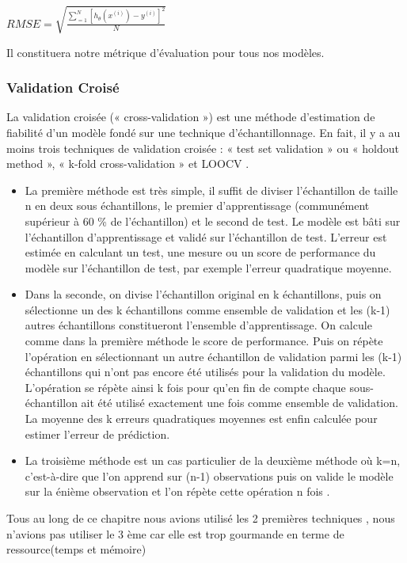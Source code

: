  $RMSE=\sqrt{\frac{\sum _{=1}^{N}{\left[{h}_{\theta}\left({x}^{(i)}\right) - {y}^{(i)}\right]}^2} {N}}$
 
 Il constituera notre métrique d'évaluation pour tous nos modèles.
\subsubsection{Validation Croisé  \cite{CrossValidation}}
La validation croisée (« cross-validation ») est une méthode d’estimation de fiabilité d’un modèle fondé sur une technique d’échantillonnage. En fait, il y a au moins trois techniques de validation croisée : « test set validation » ou « holdout method », « k-fold cross-validation » et \ac{LOOCV} .
\begin{itemize}
	\item La première méthode est très simple, il suffit de diviser l'échantillon de taille n en deux sous échantillons, le premier d'apprentissage (communément supérieur à 60 \% de l'échantillon) et le second de test. Le modèle est bâti sur l'échantillon d'apprentissage et validé sur l'échantillon de test. L'erreur est estimée en calculant un test, une mesure ou un score de performance du modèle sur l'échantillon de test, par exemple l'erreur quadratique moyenne.
	\item Dans la seconde, on divise l'échantillon original en k échantillons, puis on sélectionne un des k échantillons comme ensemble de validation et les (k-1) autres échantillons constitueront l'ensemble d'apprentissage. On calcule comme dans la première méthode le score de performance. Puis on répète l'opération en sélectionnant un autre échantillon de validation parmi les (k-1) échantillons qui n'ont pas encore été utilisés pour la validation du modèle. L'opération se répète ainsi k fois pour qu'en fin de compte chaque sous-échantillon ait été utilisé exactement une fois comme ensemble de validation. La moyenne des k erreurs quadratiques moyennes est enfin calculée pour estimer l'erreur de prédiction. 
	\item La troisième méthode est un cas particulier de la deuxième méthode où k=n, c'est-à-dire que l'on apprend sur (n-1) observations puis on valide le modèle sur la énième observation et l'on répète cette opération n fois . 
\end{itemize}

Tous au long de ce chapitre nous avions utilisé les 2 premières techniques , nous n'avions pas utiliser le 3 ème car elle est trop gourmande  en terme de ressource(temps et mémoire) 

